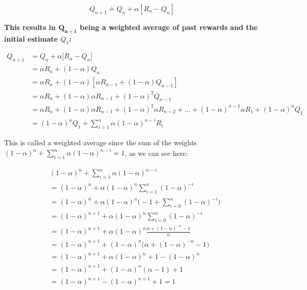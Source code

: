 \begin{equation}
    Q_{n+1} \doteq Q_n + \alpha \left[R_n - Q_n \right]
    \label{eq:ch3-nonstationaryincrementalupdaterule}
\end{equation}

\textbf{This results in $\boldsymbol{Q_{n+1}}$ being a weighted average of past rewards and the initial estimate $Q_1$:}

\begin{equation}
    \begin{split}
        Q_{n+1} &= Q_n + \alpha \Big[ R_n - Q_n \Big] \\
        &= \alpha R_n + (1 - \alpha) Q_n \\
        &= \alpha R_n + (1 - \alpha) [\alpha R_{n-1} + (1 - \alpha) Q_{n-1}] \\
        &= \alpha R_n + (1 - \alpha) \alpha R_{n-1} + (1 - \alpha)^2 Q_{n-1} \\
        &= \alpha R_n + (1 - \alpha) \alpha R_{n-1} + (1 - \alpha)^2 \alpha R_{n-2} + ... + (1 - \alpha)^{n-1} \alpha R_1 + (1 - \alpha)^n Q_1 \\
        &= (1 - \alpha)^n Q_1 + \sum_{i=1}^{n} \alpha (1 - \alpha)^{n-i} R_i
    \end{split}
    \label{eq:ch3-exponentialrecencyweightedaverage}
\end{equation}

This is called a weighted average since the sum of the weights $(1 - \alpha)^n + \sum_{i=1}^{n} \alpha (1 - \alpha)^{n-i} = 1$, as we can see here:

\begin{equation*}
    \begin{split}
        & (1 - \alpha)^n + \sum_{i=1}^{n} \alpha (1 - \alpha)^{n-i} \\
        &= (1 - \alpha)^n + \alpha (1 - \alpha)^n \sum_{i=1}^{n} (1 - \alpha)^{-i} \\
        &= (1 - \alpha)^n + \alpha (1 - \alpha)^n \Big(-1 + \sum_{i=0}^{n} (1 - \alpha)^{-i} \Big) \\
        &= (1 - \alpha)^{n+1} + \alpha (1 - \alpha)^n \sum_{i=0}^{n} (1 - \alpha)^{-i} \\
        &= (1 - \alpha)^{n+1} + \alpha (1 - \alpha)^n \frac{\alpha + (1 - \alpha)^{-n} -1}{\alpha} \\
        &= (1 - \alpha)^{n+1} + (1 - \alpha)^n \Big( \alpha + (1 - \alpha)^{-n} -1 \Big) \\
        &= (1 - \alpha)^{n+1} + \alpha (1 - \alpha)^n + 1 - (1 - \alpha)^n \\
        &= (1 - \alpha)^{n+1} + (1 - \alpha)^n (\alpha - 1) + 1 \\
        &= (1 - \alpha)^{n+1} - (1 - \alpha)^{n+1} + 1 = 1
    \end{split}
\end{equation*}

